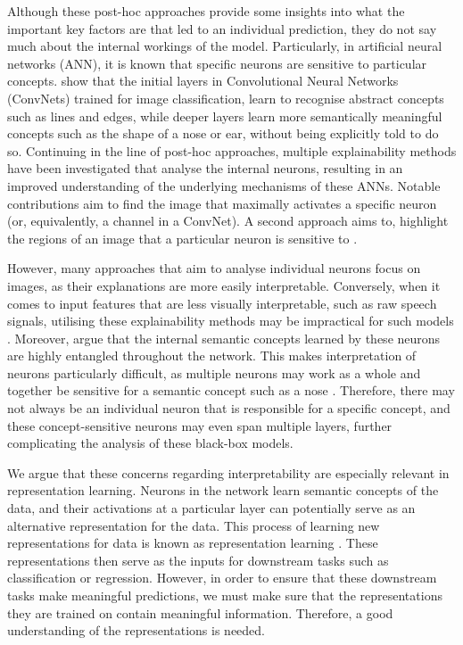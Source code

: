 Although these post-hoc approaches provide some insights into what the important key factors are that led to an individual prediction, they do not say much about the internal workings of the model. Particularly, in artificial neural networks (ANN), it is known that specific neurons are sensitive to particular concepts. \cite{zeilerVisualizingUnderstandingConvolutional2013} show that the initial layers in Convolutional Neural Networks (ConvNets) trained for image classification, learn to recognise abstract concepts such as lines and edges, while deeper layers learn more semantically meaningful concepts such as the shape of a nose or ear, without being explicitly told to do so. Continuing in the line of post-hoc approaches, multiple explainability methods have been investigated that analyse the internal neurons, resulting in an improved understanding of the underlying mechanisms of these ANNs. Notable contributions aim to find the image that maximally activates a specific neuron \citep{simonyanDeepConvolutionalNetworks2014} (or, equivalently, a channel in a ConvNet). A second approach aims to, highlight the regions of an image that a particular neuron is sensitive to \citep{zeilerVisualizingUnderstandingConvolutional2013}.

However, many approaches that aim to analyse individual neurons focus on images, as their explanations are more easily interpretable. Conversely, when it comes to input features that are less visually interpretable, such as raw speech signals, utilising these explainability methods may be impractical for such models \citep{krugAnalyzingVisualizingDeep2021}. Moreover, \cite{bauNetworkDissectionQuantifying2017} argue that the internal semantic concepts learned by these neurons are highly entangled throughout the network. This makes interpretation of neurons particularly difficult, as multiple neurons may work as a whole and together be sensitive for a semantic concept such as a nose \citep{molnarInterpretableMachineLearning2022}. Therefore, there
may not always be an individual neuron that is responsible for a specific concept, and these concept-sensitive neurons may even span multiple layers, further complicating the analysis of these black-box models.

We argue that these concerns regarding interpretability are especially relevant in representation learning. Neurons in the network learn semantic concepts of the data, and their activations at a particular layer can potentially serve as an alternative representation for the data. This process of learning new representations for data is known as representation learning \citep{le-khacContrastiveRepresentationLearning2020}. These representations then serve as the inputs for downstream tasks such as classification or regression. However, in order to ensure that these downstream tasks make meaningful predictions, we must make sure that the representations they are trained on contain meaningful information. Therefore, a good understanding of the representations is needed.

